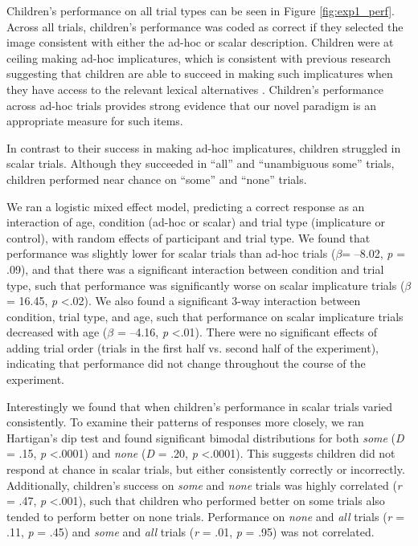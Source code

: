 \documentclass[man]{apa2}
\begin{document}
Children's performance on all trial types can be seen in Figure \ref{fig:exp1_perf}. Across all trials, children's performance was coded as correct if they selected the image consistent with either the ad-hoc or scalar description. Children were at ceiling making ad-hoc implicatures, which is consistent with previous research suggesting that children are able to succeed in making such implicatures when they have access to the relevant lexical alternatives \cite{Stiller2014}. Children's performance across ad-hoc trials provides strong evidence that our novel paradigm is an appropriate measure for such items.

In contrast to their success in making ad-hoc implicatures, children struggled in scalar trials. Although they succeeded in ``all'' and ``unambiguous some'' trials, children performed near chance on ``some'' and ``none'' trials. 

We ran a logistic mixed effect model, predicting a correct response as an interaction of age, condition (ad-hoc or scalar) and trial type (implicature or control), with random effects of participant and trial type. We found that performance was slightly lower for scalar trials than ad-hoc trials ($\beta$= --8.02, \textit{p} = .09), and that there was a significant interaction between condition and trial type, such that performance was significantly worse on scalar implicature trials ($\beta$= 16.45, \textit{p} \textless  .02). We also found a significant 3-way interaction between condition, trial type, and age, such that performance on scalar implicature trials decreased with age ($\beta$ = --4.16, \textit{p} \textless  .01). There were no significant effects of adding trial order (trials in the first half vs. second half of the experiment), indicating that performance did not change throughout the course of the experiment. 

Interestingly we found that when children's performance in scalar trials varied consistently. To examine their patterns of responses more closely, we ran Hartigan's dip test and found significant bimodal distributions for both \textit{some} (\textit{D} = .15, \textit{p} \textless  .0001) and \textit{none} (\textit{D} = .20, \textit{p} \textless  .0001). This suggests children did not respond at chance in scalar trials, but either consistently correctly or incorrectly. Additionally, children's success on \textit{some} and \textit{none} trials was highly correlated (\textit{r} = .47, \textit{p} \textless  .001), such that children who performed better on some trials also tended to perform better on none trials.  Performance on \textit{none} and \textit{all} trials (\textit{r} = .11, \textit{p} = .45) and \textit{some} and \textit{all} trials (\textit{r} = .01, \textit{p} = .95) was not correlated. 
\end{document}
